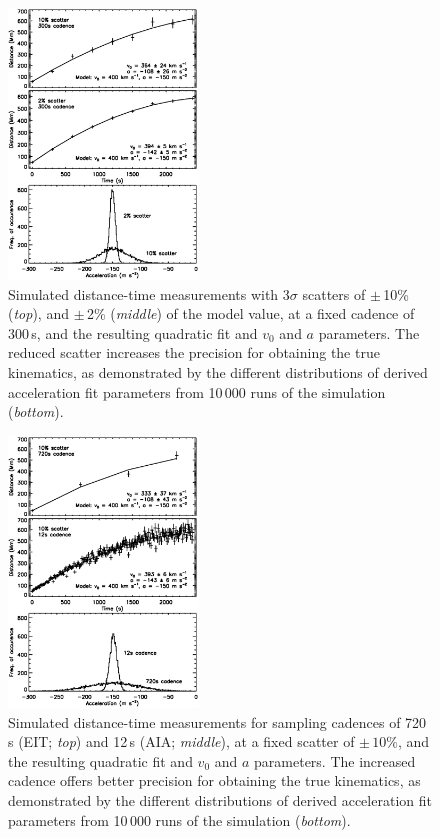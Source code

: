 \documentclass[structabstract]{aa}
\begin{document}
\begin{figure}[!t]
\begin{center}
\includegraphics[width = 0.45\textwidth]{images/noise_hist_jpb.eps}
\caption{Simulated distance-time measurements with 3$\sigma$ scatters of $\pm$\,10\% (\emph{top}), and $\pm$\,2\% (\emph{middle}) of the model value, at a fixed cadence of $300$\,s, and the resulting quadratic fit and $v_0$ and $a$ parameters. The reduced scatter increases the precision for obtaining the true kinematics, as demonstrated by the different distributions of derived acceleration fit parameters from 10\,000 runs of the simulation (\emph{bottom}).}
\label{noise_hist_weight}
\end{center}
\end{figure}

\begin{figure}[!t]
\begin{center}
\includegraphics[width = 0.45\textwidth]{images/cad_hist_jpb.eps}
\caption{Simulated distance-time measurements for sampling cadences of 720\,s (EIT; \emph{top}) and 12\,s (AIA; \emph{middle}), at a fixed scatter of $\pm\,10\%$, and the resulting quadratic fit and $v_0$ and $a$ parameters. The increased cadence offers better precision for obtaining the true kinematics, as demonstrated by the different distributions of derived acceleration fit parameters from 10\,000 runs of the simulation (\emph{bottom}).}
\label{cad_hist_weight}
\end{center}
\end{figure}
\end{document}

